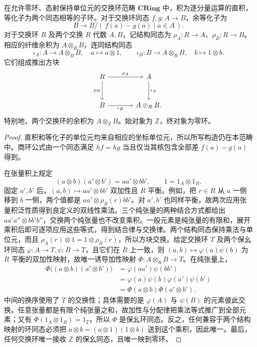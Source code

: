 \begin{proposition}[交换环中的基本构造]\label{b4:prop:ring-limits-colimits}
	在允许零环、态射保持单位元的交换环范畴 \(\mathbf{CRing}\) 中，积为逐分量运算的直积，等化子为两个同态相等的子环。对于交换环同态 \(f,g:A\rightarrow B\)，余等化子为
	\[
		B\longrightarrow B/(\,f(a)-g(a)\mid a\in A\,).
	\]
	对于交换环 \(R\) 及两个交换 \(R\) 代数 \(A,B\)，记结构同态为 \(\rho_A:R\rightarrow A\)、\(\rho_B:R\rightarrow B\)。相应的纤维余积为 \(A\otimes_RB\)，连同结构同态
	\[
		\iota_A:A\longrightarrow A\otimes_RB,\quad a\longmapsto a\otimes1, \qquad \iota_B:B\longrightarrow A\otimes_RB,\quad b\longmapsto1\otimes b.
	\]
	它们组成推出方块
	\[
		\begin{tikzcd}[column sep=large,row sep=large]
			R\arrow[r,"\rho_A"]\arrow[d,"\rho_B"']&A\arrow[d,"\iota_A"]\\
			B\arrow[r,"\iota_B"']&A\otimes_RB.
		\end{tikzcd}
	\]
	特别地，两个交换环的余积为 \(A\otimes_{\mathbb Z}B\)。始对象为 \(\mathbb Z\)，终对象为零环。
\end{proposition}
\begin{proof}
	直积和等化子的单位元均来自相应的坐标单位元，所以所写构造仍在本范畴中。商环公式由一个同态满足 \(hf=hg\) 当且仅当其核包含全部差 \(f(a)-g(a)\) 得到。

	在张量积上规定
	\[
		(a\otimes b)(a'\otimes b')=aa'\otimes bb',\qquad 1=1_A\otimes1_B.
	\]
	固定 \(a',b'\) 后，\((a,b)\mapsto aa'\otimes bb'\) 双加性且 \(R\) 平衡。例如，把 \(r\in R\) 从 \(a\) 一侧移到 \(b\) 一侧，两个值都是 \(aa'\otimes\rho_B(r)bb'\)。对 \(a',b'\) 也同样平衡，故两次应用张量积泛性质得到良定义的双线性乘法。三个纯张量的两种结合方式都给出 \(aa' a''\otimes bb' b''\)，交换两个纯张量也不改变乘积。一般元素是纯张量的有限和，展开乘积后即可逐项应用这些等式，得到结合律与交换律。两个结构同态保持乘法与单位元，而且 \(\rho_A(r)\otimes1=1\otimes\rho_B(r)\)，所以方块交换。给定交换环 \(T\) 及两个保幺环同态 \(\varphi:A\rightarrow T,\psi:B\rightarrow T\)，且它们在 \(R\) 上一致，则 \((a,b)\mapsto\varphi(a)\psi(b)\) 为 \(R\) 平衡的双加性映射，故唯一诱导加性映射 \(\Phi:A\otimes_RB\rightarrow T\)。在纯张量上，
	\[
		\begin{aligned}
			\Phi\bigl((a\otimes b)(a'\otimes b')\bigr) &=\varphi(aa')\psi(bb')\\
			&=\varphi(a)\psi(b)\varphi(a')\psi(b')\\
			&=\Phi(a\otimes b)\Phi(a'\otimes b').
		\end{aligned}
	\]
	中间的换序使用了 \(T\) 的交换性；具体需要的是 \(\varphi(A)\) 与 \(\psi(B)\) 的元素彼此交换。任意张量都是有限个纯张量之和，故加性与分配律把乘法等式推广到全部元素；又有 \(\Phi(1_A\otimes1_B)=1_T\)，所以 \(\Phi\) 是保幺环同态。反之，任何兼容于两个结构映射的环同态必须把 \(a\otimes b=(a\otimes1)(1\otimes b)\) 送到这个乘积，因此唯一。最后，任何交换环唯一接收 \(\mathbb Z\) 的保幺同态，且唯一映到零环。
\end{proof}

